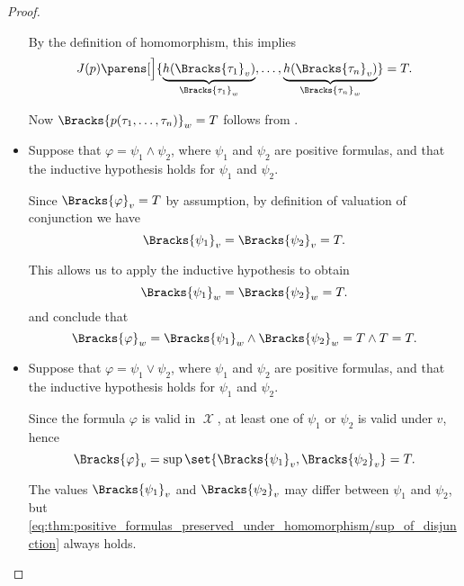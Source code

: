 \begin{proof}
\begin{itemize}
    By the definition of homomorphism, this implies
    \begin{equation}\label{eq:thm:positive_formulas_preserved_under_homomorphism/predicates/y}
      J(p) \parens[\Big]{ \underbrace{h(\Bracks{\tau_1}_v)}_{\Bracks{\tau_1}_w}, \ldots, \underbrace{h(\Bracks{\tau_n}_v)}_{\Bracks{\tau_n}_w} } = T.
    \end{equation}

    Now \( \Bracks{p(\tau_1, \ldots, \tau_n)}_w = T \) follows from .

    \item Suppose that \( \varphi = \psi_1 \wedge \psi_2 \), where \( \psi_1 \) and \( \psi_2 \) are positive formulas, and that the inductive hypothesis holds for \( \psi_1 \) and \( \psi_2 \).

    Since \( \Bracks{\varphi}_v = T \) by assumption, by definition of valuation of conjunction we have
    \begin{equation*}
      \Bracks{\psi_1}_v
      =
      \Bracks{\psi_2}_v
      =
      T.
    \end{equation*}

    This allows us to apply the inductive hypothesis to obtain
    \begin{equation*}
      \Bracks{\psi_1}_w
      =
      \Bracks{\psi_2}_w
      =
      T.
    \end{equation*}
    and conclude that
    \begin{equation*}
      \Bracks{\varphi}_w
      =
      \Bracks{\psi_1}_w \wedge \Bracks{\psi_2}_w
      =
      T \wedge T
      =
      T.
    \end{equation*}

    \item Suppose that \( \varphi = \psi_1 \vee \psi_2 \), where \( \psi_1 \) and \( \psi_2 \) are positive formulas, and that the inductive hypothesis holds for \( \psi_1 \) and \( \psi_2 \).

    Since the formula \( \varphi \) is valid in \( \mscrX \), at least one of \( \psi_1 \) or \( \psi_2 \) is valid under \( v \), hence
    \begin{equation}\label{eq:thm:positive_formulas_preserved_under_homomorphism/sup_of_disjunction}
      \Bracks{\varphi}_v = \sup\set{ \Bracks{\psi_1}_v, \Bracks{\psi_2}_v } = T.
    \end{equation}

    The values \( \Bracks{\psi_1}_v \) and \( \Bracks{\psi_2}_v \) may differ between \( \psi_1 \) and \( \psi_2 \), but \eqref{eq:thm:positive_formulas_preserved_under_homomorphism/sup_of_disjunction} always holds.


\end{itemize}
\end{proof}
